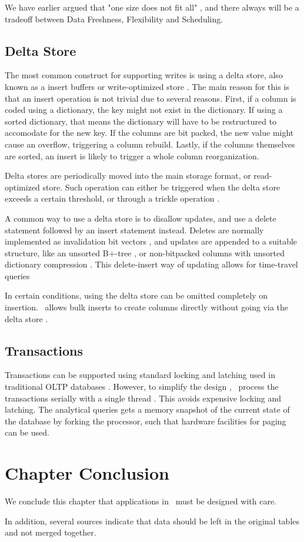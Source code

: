 We have earlier argued that "one size does not fit all" \cite{Psaroudakis2014-ma}, and there always will be a tradeoff between Data Freshness, Flexibility and Scheduling.


\subsection{Delta Store}
\label{sub:Delta Store}
The most common construct for supporting writes is using a delta store, also known as a insert buffers or write-optimized store \cite{Raman2013-em, Stonebraker2005-qz}. The main reason for this is that an insert operation is not trivial due to several reasons. First, if a column is coded using a dictionary, the key might not exist in the dictionary. If using a sorted dictionary, that means the dictionary will have to be restructured to accomodate for the new key. If the columns are bit packed, the new value might cause an overflow, triggering a column rebuild. Lastly, if the columns themselves are sorted, an insert is likely to trigger a whole column reorganization.

Delta stores are periodically moved into the main storage format, or read-optimized store. Such operation can either be triggered when the delta store exceeds a certain threshold, or through a trickle operation \cite{Lahiri2015-mz, Farber2012-vh}.

A common way to use a delta store is to disallow updates, and use a delete statement followed by an insert statement instead. Deletes are normally implemented as invalidation bit vectors \cite{Raman2013-em, Lamb2012-kg}, and updates are appended to a suitable structure, like an unsorted B+-tree \cite{Psaroudakis2014-ma}, or non-bitpacked columns with unsorted dictionary compression \cite{Farber2012-vh}. This delete-insert way of updating allows for time-travel queries \cite{Schwalb2014-hn, Plattner2014-fr}

In certain conditions, using the delta store can be omitted completely on insertion. \mssql~allows bulk inserts to create columns directly without going via the delta store \cite{Larson2013-mc}.

\subsection{Transactions}
\label{sub:Transactions}
Transactions can be supported using standard locking and latching used in traditional OLTP databases \cite{Lamb2012-kg}. However, to simplify the design , \hyper~process the transactions serially with a single thread \cite{Psaroudakis2014-ma}. This avoids expensive locking and latching. The analytical queries gets a memory snapshot of the current state of the database by forking the processor, such that hardware facilities for paging can be used.

\section{Chapter Conclusion}
\label{sec:Chapter Conclusion}
We conclude this chapter that applications in \bd~must be designed with care.

In addition, several sources indicate that data should be left in the original tables and not merged together.
